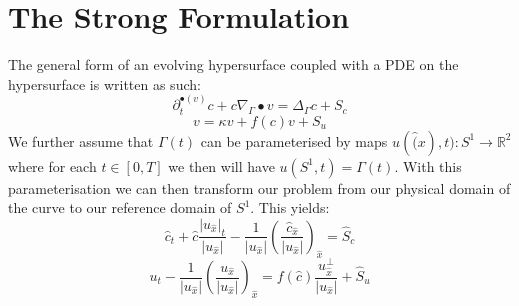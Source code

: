 \documentclass[a4paper, 11pt]{article}
\begin{document}
\section{The Strong Formulation}
The general form of an evolving hypersurface coupled with a PDE on the hypersurface is written as such:
\begin{equation}
  \partial^{\bullet(v)}_t c + c\nabla_\Gamma\bullet v = \Delta_\Gamma c + S_c
\end{equation}
\begin{equation}
  v=\kappa v + f(c)v + S_u
\end{equation}
We further assume that $\Gamma(t)$ can be parameterised by maps $u(\hat(x),t):S^1\rightarrow\mathbb{R}^2$ where for each $t\in[0,T]$ we then will have $u(S^1, t)=\Gamma(t)$. With this parameterisation we can then transform our problem from our physical domain of the curve to our reference domain of $S^1$. This yields: 
\begin{equation}
  \hat{c}_t + \hat{c}\frac{|u_{\hat{x}}|_t}{|u_{\hat{x}}|} - \frac{1}{|u_{\hat{x}}|}\left(\frac{\hat{c}_{\hat{x}}}{|u_{\hat{x}}|}\right)_{\hat{x}} = \hat{S}_c
\end{equation}
\begin{equation}
  u_t - \frac{1}{|u_{\hat{x}}|}\left(\frac{u_{\hat{x}}}{|u_{\hat{x}}|}\right)_{\hat{x}} = f(\hat{c})\frac{u_{\hat{x}}^\bot}{|u_{\hat{x}}|}+\hat{S}_u 
\end{equation}

\pagebreak
\end{document}

